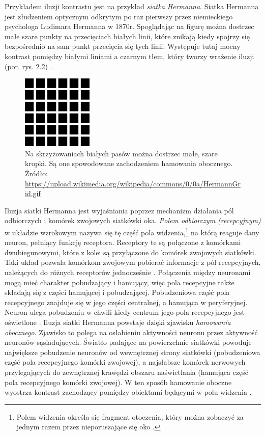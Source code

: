 \documentclass[licencjacka]{kdypl}
\begin{document}
Przykładem iluzji kontrastu jest na przykład \textit{siatka Hermanna}. Siatka Hermanna jest złudzeniem optycznym odkrytym po raz pierwszy przez niemieckiego psychologa Ludimara Hermanna w 1870r. Spoglądając na figurę można dostrzec małe szare punkty na przecięciach białych linii, które znikają kiedy spojrzy się bezpośrednio na sam punkt przecięcia się tych linii. Występuje tutaj mocny kontrast pomiędzy białymi liniami a czarnym tłem, który tworzy wrażenie iluzji (por. rys. 2.2) \citep{Macperson}.

\begin{figure}[H]
\includegraphics[width=0.3\textwidth]{grid.png}
\centering
\caption{ Na skrzyżowaniach białych pasów można dostrzec małe, szare kropki. Są one spowodowane zachodzeniem hamowania obocznego. Źródło: \url{https://upload.wikimedia.org/wikipedia/commons/0/0a/HermannGrid.gif}}
\end{figure}

 Iluzja siatki Hermanna jest wyjaśniania poprzez mechanizm działania pól odbiorczych i komórek zwojowych siatkówki oka. \textit{Polem odbiorczym (recepcyjnym)} w układzie wzrokowym nazywa się tę część pola widzenia,\footnote{Polem widzenia określa się fragment otoczenia, który można zobaczyć za jednym razem przez nieporuszające się oko \citep[s. 159]{Kalat}.} na którą reaguje dany neuron, pełniący funkcję receptora. Receptory te są połączone z komórkami dwubiegunowymi, które z kolei są przyłączone do komórek zwojowych siatkówki. Taki układ pozwala komórkom zwojowym pobierać informacje z pól recepcyjnych, należących do różnych receptorów jednocześnie \citep[s. 159]{Kalat}. Połączenia między neuronami mogą mieć charakter pobudzający i hamujący, więc pola recepcyjne także składają się z części hamującej i pobudzającej. Pobudzeniowa część pola recepcyjnego znajduje się w jego części centralnej, a hamująca w peryferyjnej. Neuron ulega pobudzeniu w chwili kiedy centrum jego pola recepcyjnego jest oświetlone \citep[s. 160]{Kalat}. Iluzja siatki Hermanna powstaje dzięki zjawisku \textit{hamowania obocznego}. Zjawisko to polega na osłabieniu aktywności neuronu przez aktywność neuronów sąsiadujących. Światło padające na powierzchnie siatkówki powoduje największe pobudzenie neuronów od wewnętrznej strony siatkówki (pobudzeniowa część pola recepcyjnego komórki zwojowej), a najsłabsze komórek nerwowych przylegających do zewnętrznej krawędzi obszaru naświetlania (hamująca część pola recepcyjnego komórki zwojowej). W ten sposób hamowanie oboczne wyostrza kontrast zachodzący pomiędzy obiektami będącymi w polu widzenia \citep[s. 161-162]{Kalat}.
\end{document}

